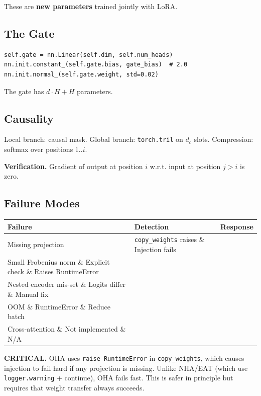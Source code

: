 These are \textbf{new parameters} trained jointly with LoRA.

\subsection{The Gate}

\begin{lstlisting}
self.gate = nn.Linear(self.dim, self.num_heads)
nn.init.constant_(self.gate.bias, gate_bias)  # 2.0
nn.init.normal_(self.gate.weight, std=0.02)
\end{lstlisting}

The gate has $d \cdot H + H$ parameters.

\subsection{Causality}

Local branch: causal mask.
Global branch: \texttt{torch.tril} on $d_c$ slots.
Compression: softmax over positions $1..i$.

\textbf{Verification.} Gradient of output at position $i$ w.r.t. input at 
position $j > i$ is zero.

\subsection{Failure Modes}

\begin{table}[H]
\centering
\small
\begin{tabular}{lll}
\toprule
\textbf{Failure} & \textbf{Detection} & \textbf{Response} \\
\midrule
Missing projection & \texttt{copy\_weights} raises \& Injection fails \\
Small Frobenius norm \& Explicit check \& Raises RuntimeError \\
Nested encoder mis-set \& Logits differ \& Manual fix \\
OOM \& RuntimeError \& Reduce batch \\
Cross-attention \& Not implemented \& N/A \\
\bottomrule
\end{tabular}
\end{table}

\textbf{CRITICAL.} OHA uses \texttt{raise RuntimeError} in \texttt{copy\_weights}, which 
causes injection to fail hard if any projection is missing. Unlike 
NHA/EAT (which use \texttt{logger.warning} + continue), OHA fails fast. This 
is safer in principle but requires that weight transfer always succeeds.

